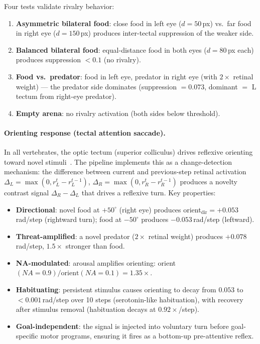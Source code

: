 \documentclass[11pt,a4paper]{article}
\begin{document}
Four tests validate rivalry behavior:
\begin{enumerate}[nosep]
  \item \textbf{Asymmetric bilateral food}: close food in left eye ($d = 50$\,px)
    vs.\ far food in right eye ($d = 150$\,px) produces inter-tectal suppression
    of the weaker side.
  \item \textbf{Balanced bilateral food}: equal-distance food in both eyes
    ($d = 80$\,px each) produces suppression $< 0.1$ (no rivalry).
  \item \textbf{Food vs.\ predator}: food in left eye, predator in right eye
    (with $2\times$ retinal weight) --- the predator side dominates
    (suppression $= 0.073$, dominant $= $ L tectum from right-eye predator).
  \item \textbf{Empty arena}: no rivalry activation (both sides below threshold).
\end{enumerate}

\paragraph{Orienting response (tectal attention saccade).}
In all vertebrates, the optic tectum (superior colliculus) drives reflexive
orienting toward novel stimuli~\cite{nikolaou2012}. The pipeline implements this
as a change-detection mechanism: the difference between current and previous-step
retinal activation $\Delta_L = \max(0, r_L^t - r_L^{t-1})$,
$\Delta_R = \max(0, r_R^t - r_R^{t-1})$ produces a novelty contrast signal
$\Delta_R - \Delta_L$ that drives a reflexive turn. Key properties:

\begin{itemize}[nosep]
  \item \textbf{Directional}: novel food at $+50^\circ$ (right eye) produces
    orient$_\text{dir} = +0.053$\,rad/step (rightward turn); food at $-50^\circ$
    produces $-0.053$\,rad/step (leftward).
  \item \textbf{Threat-amplified}: a novel predator ($2\times$ retinal weight)
    produces $+0.078$\,rad/step, $1.5\times$ stronger than food.
  \item \textbf{NA-modulated}: arousal amplifies orienting:
    orient$(NA{=}0.9) / \text{orient}(NA{=}0.1) = 1.35\times$.
  \item \textbf{Habituating}: persistent stimulus causes orienting to decay from
    $0.053$ to $< 0.001$\,rad/step over 10 steps (serotonin-like habituation),
    with recovery after stimulus removal (habituation decays at $0.92\times$/step).
  \item \textbf{Goal-independent}: the signal is injected into voluntary turn
    before goal-specific motor programs, ensuring it fires as a bottom-up
    pre-attentive reflex.
\end{itemize}
\end{document}
